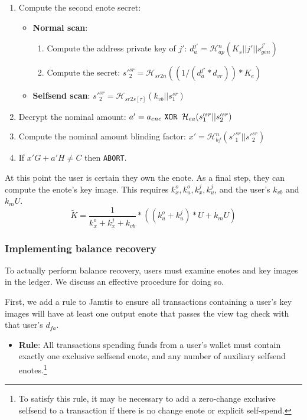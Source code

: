 \begin{enumerate}
    \item Compute the second enote secret:
        \begin{itemize}
        \item \textbf{Normal scan}:
            \begin{enumerate}
                \item Compute the address private key of $j'$: $d^{j'}_a = \mathcal{H}^n_{ap}(K_s || j' || s^{j'}_{gen})$
                \item Compute the secret: $s'^{sr}_2 = \mathcal{H}_{sr2n}((1/(d^{j'}_a * d_{vr})) * K_e)$
            \end{enumerate}
        \item \textbf{Selfsend scan}: $s'^{sr}_2 = \mathcal{H}_{sr2s[\tau]}(k_{vb} || s^{sr}_1)$
    \end{itemize}

    \item Decrypt the nominal amount: $a' = a_{enc} \textrm{ \tt  XOR } \mathcal{H}_{ea}(s'^{sr}_1 || s'^{sr}_2)$

    \item Compute the nominal amount blinding factor: $x' = \mathcal{H}^n_{bf}(s'^{sr}_1 || s'^{sr}_2)$

    \item If $x' G + a' H \neq C$ then {\tt ABORT}.
\end{enumerate}

At this point the user is certain they own the enote. As a final step, they can compute the enote's key image. This requires $k^o_x, k^o_u, k^j_x, k^j_u$, and the user's $k_{vb}$ and $k_m U$.\vspace{.115cm}
\[ \tilde{K} = \frac{1}{k^o_x + k^j_x + k_{vb}} *((k^o_u + k^j_u)*U + k_m U) \]

\subsubsection{Implementing balance recovery}
\label{subsubsec:jamtis-balance-recovery-implementing}

To actually perform balance recovery, users must examine enotes and key images in the ledger. We discuss an effective procedure for doing so.

First, we add a rule to Jamtis to ensure all transactions containing a user's key images will have at least one output enote that passes the view tag check with that user's $d_{fa}$.
\begin{itemize}
    \item \textbf{Rule}: All transactions spending funds from a user's wallet must contain exactly one exclusive selfsend enote, and any number of auxiliary selfsend enotes.\footnote{To satisfy this rule, it may be necessary to add a zero-change exclusive selfsend to a transaction if there is no change enote or explicit self-spend.}
\end{itemize}

